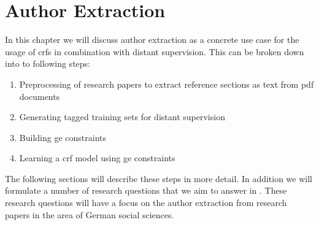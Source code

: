 \chapter{Author Extraction}\label{cha:author-extraction}

\newcommand\researchquestionformat[1]{\begin{quote}#1\end{quote}}

\newcommand\researchquestionone{\researchquestionformat{%
  \RQ{1}: Given a set of unlabeled reference sections from the research area of German social sciences, does using an author list that is related to this area improve the performance of the learned \gls{crf} model in comparison with using an unrelated author list?
}}

\newcommand\researchquestiontwo{\researchquestionformat{%
  \RQ{2}: Given a set of reference sections from the research area of German social sciences with matched author names, does a labeling using the \gls{bieo} improve the performance of the learned \gls{crf} model in comparison with a labeling using the \gls{bio} format?
}}

\newcommand\researchquestionthree{\researchquestionformat{%
  \RQ{3}: Given a set of reference sections from the research area of German social sciences with matched author names, how does, for a word $w_n$ that has no matched author names, modifying the probability mass distribution over the labels in $Val(Y_n)$ impact the performance of a \gls{crf} model that was learned on the resulting \gls{ge} constraints?
}}

\newcommand\researchquestionfour{\researchquestionformat{%
  \RQ{4}: Given a set of reference sections from the research area of German social sciences with matched author names, how does changing the number of considered words $w_n$ which do not have matched author names impact the performance of a \gls{crf} model that was learned on the resulting \gls{ge} constraints?
}}

In this chapter we will discuss author extraction as a concrete use case for the usage of \glspl{crf} in combination with \gls{distant supervision}.
This can be broken down into to following steps:
\begin{enumerate}
  \item Preprocessing of research papers to extract reference sections as text from \gls{pdf} documents
  \item Generating tagged training sets for distant supervision
  \item Building \gls{ge} constraints
  \item Learning a \gls{crf} model using \gls{ge} constraints
\end{enumerate}
The following sections will describe these steps in more detail.
In addition we will formulate a number of research questions that we aim to answer in .
These research questions will have a focus on the author extraction from research papers in the area of German social sciences.


